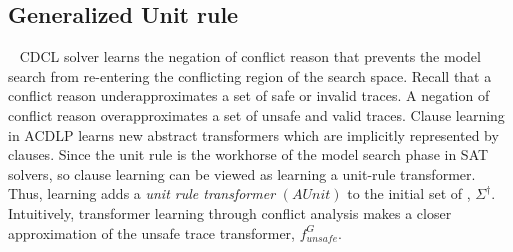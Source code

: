 %
%
\subsection{Generalized Unit rule}~\label{learning}
%
CDCL solver learns the negation of conflict reason that prevents the model search
from re-entering the conflicting region of the search space.  Recall that a conflict 
reason underapproximates a set of safe or invalid traces.  A negation of conflict reason 
overapproximates a set of unsafe and valid traces.  
Clause learning in ACDLP learns new abstract transformers which are implicitly represented 
by clauses.  Since the unit rule is the workhorse of the model search phase in SAT solvers, 
so clause learning can be viewed as learning a unit-rule transformer.  Thus, learning adds 
a \emph{unit rule transformer} $(AUnit)$ to the initial set of , $\Sigma^\dagger$.  
Intuitively, transformer learning through conflict analysis makes 
\rmcmt{$\Sigma^\dagger$} a closer approximation of the unsafe trace 
transformer, $f_{unsafe}^{G}$.


